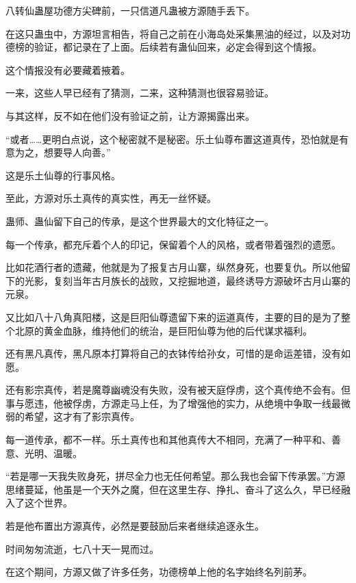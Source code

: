 
\begin{this_body}

八转仙蛊屋功德方尖碑前，一只信道凡蛊被方源随手丢下。

在这只蛊虫中，方源坦言相告，将自己之前在小海岛处采集黑油的经过，以及对功德榜的验证，都记录在了上面。后续若有蛊仙回来，必定会得到这个情报。

这个情报没有必要藏着掖着。

一来，这些人早已经有了猜测，二来，这种猜测也很容易验证。

与其这样，反不如在他们没有验证之前，让方源揭露出来。

“或者……更明白点说，这个秘密就不是秘密。乐土仙尊布置这道真传，恐怕就是有意为之，想要导人向善。”

这是乐土仙尊的行事风格。

至此，方源对乐土真传的真实性，再无一丝怀疑。

蛊师、蛊仙留下自己的传承，是这个世界最大的文化特征之一。

每一个传承，都充斥着个人的印记，保留着个人的风格，或者带着强烈的遗愿。

比如花酒行者的遗藏，他就是为了报复古月山寨，纵然身死，也要复仇。所以他留下的光影，复刻当年古月族长的战败，又挖掘地道，最终诱导方源破坏古月山寨的元泉。

又比如八十八角真阳楼，这是巨阳仙尊遗留下来的运道真传，主要的目的是为了整个北原的黄金血脉，维持他们的统治，是巨阳仙尊为他的后代谋求福利。

还有黑凡真传，黑凡原本打算将自己的衣钵传给孙女，可惜的是命运差错，没有如愿。

还有影宗真传，若是魔尊幽魂没有失败，没有被天庭俘虏，这个真传绝不会有。但事与愿违，他被俘虏，方源走马上任，为了增强他的实力，从绝境中争取一线最微弱的希望，这才有了影宗真传。

每一道传承，都不一样。乐土真传也和其他真传大不相同，充满了一种平和、善意、光明、温暖。

“若是哪一天我失败身死，拼尽全力也无任何希望。那么我也会留下传承罢。”方源思绪蔓延，他虽是一个天外之魔，但在这里生存、挣扎、奋斗了这么久，早已经融入了这个世界。

若是他布置出方源真传，必然是要鼓励后来者继续追逐永生。

时间匆匆流逝，七八十天一晃而过。

在这个期间，方源又做了许多任务，功德榜单上他的名字始终名列前茅。


\end{this_body}
